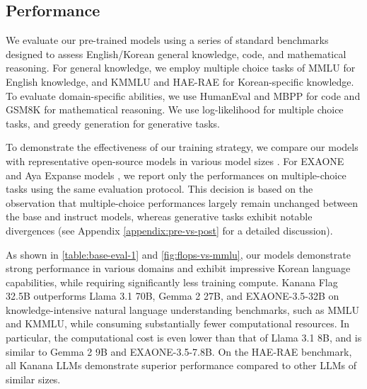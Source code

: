 \subsection{Performance}
\label{subsec:pretrain_overview}





We evaluate our pre-trained models using a series of standard benchmarks designed to assess English/Korean general knowledge, code, and mathematical reasoning.
For general knowledge, we employ multiple choice tasks of MMLU \citep{hendryckstest2021} for English knowledge, and KMMLU \citep{son2024kmmlu} and HAE-RAE \citep{son-etal-2024-hae} for Korean-specific knowledge.
To evaluate domain-specific abilities, we use HumanEval \citep{humaneval} and MBPP \citep{mbpp} for code and GSM8K \citep{cobbe2021gsm8k} for mathematical reasoning.
We use log-likelihood for multiple choice tasks, and greedy generation for generative tasks.

To demonstrate the effectiveness of our training strategy, we compare our models with representative open-source models in various model sizes \citep{llama3, gemma2024gemma2, qwen25techreport, research2024exaone, dang2024ayaexpansecombiningresearch}.
For EXAONE and Aya Expanse models \citep{research2024exaone, dang2024ayaexpansecombiningresearch}, we report only the performances on multiple-choice tasks using the same evaluation protocol.
This decision is based on the observation that multiple-choice performances largely remain unchanged between the base and instruct models, whereas generative tasks exhibit notable divergences (see Appendix \ref{appendix:pre-vs-post} for a detailed discussion).

As shown in \autoref{table:base-eval-1} and \autoref{fig:flops-vs-mmlu}, our models demonstrate strong performance in various domains and exhibit impressive Korean language capabilities, while requiring significantly less training compute. 
Kanana Flag 32.5B outperforms Llama 3.1 70B, Gemma 2 27B, and EXAONE-3.5-32B on knowledge-intensive natural language understanding benchmarks, such as MMLU and KMMLU, while consuming substantially fewer computational resources. 
In particular, the computational cost is even lower than that of Llama 3.1 8B, and is similar to Gemma 2 9B and EXAONE-3.5-7.8B. 
On the HAE-RAE benchmark, all Kanana LLMs demonstrate superior performance compared to other LLMs of similar sizes.